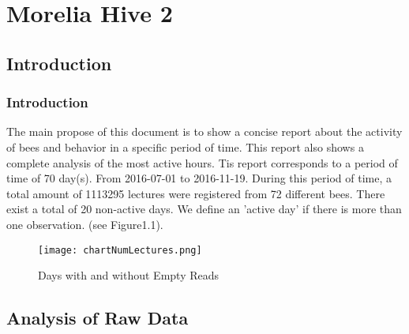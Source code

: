 \documentclass[11pt,fleqn]{book} %
\begin{document}


\pagestyle{empty} %

\tableofcontents %


\pagestyle{fancy} %

\part{Morelia Hive 2}
\chapter{Introduction}
\normalsize%
\section*{Introduction}%
The main propose of this document  is to show a concise report about the activity of bees and behavior in a specific period of time. This report also shows a complete analysis of the most active hours.\newline%
\newline%
Tis report corresponds to a period of time of 70 day(s). From 2016{-}07{-}01 to 2016{-}11{-}19. During this period of time, a total amount of 1113295 lectures were registered from 72 different bees. There exist a total of 20 non{-}active days. We define an 'active day' if there is more than one observation. (see Figure1.1).\newline%
\newline%
%


\begin{figure}[h!]%
\centering%
\texttt{[image: chartNumLectures.png]}%
\caption{Days with and without Empty Reads}%
\end{figure}


\chapter{Analysis of Raw Data}
\normalsize%
\end{document}
